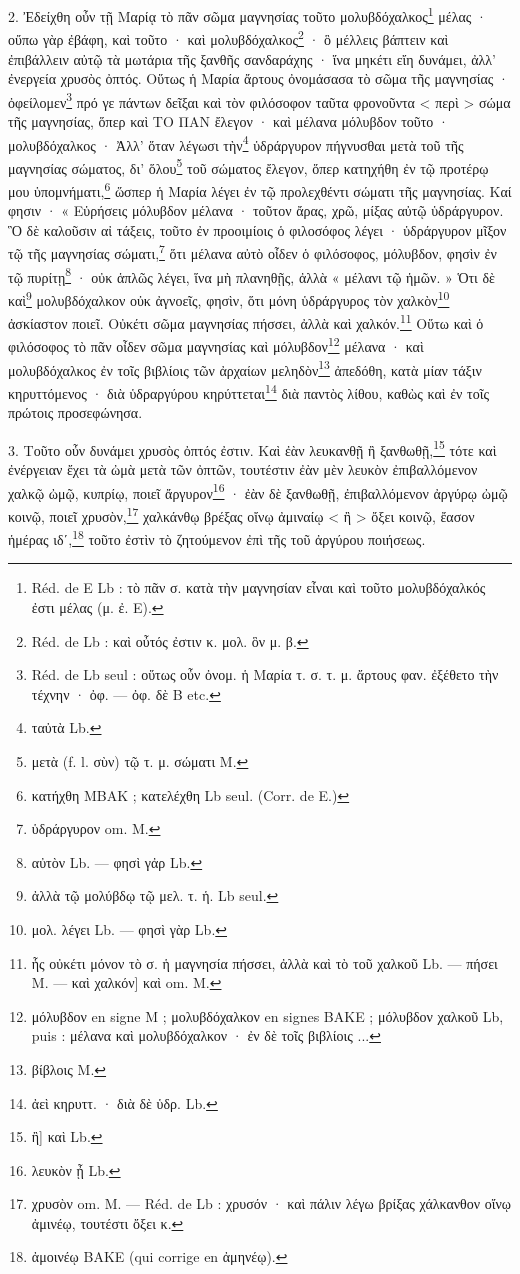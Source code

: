 \documentclass[landscape, a4paper, 11pt, oneside, polutonikogreek, french]{article}
\begin{document}
2. Ἐδείχθη οὖν τῇ Μαρίᾳ τὸ πᾶν σῶμα μαγνησίας τοῦτο μολυβδόχαλκος\footnote{Réd. de E Lb : τὸ πᾶν σ. κατὰ τὴν μαγνησίαν εἶναι καὶ τοῦτο μολυβδόχαλκός ἐστι μέλας (μ. ἐ. E).} μέλας · οὔπω γὰρ ἐβάφη, καὶ τοῦτο · καὶ μολυβδόχαλκος\footnote{Réd. de Lb : καὶ οὖτός ἐστιν κ. μολ. ὃν μ. β.} · ὃ μέλλεις βάπτειν καὶ ἐπιβάλλειν αὐτῷ τὰ μωτάρια τῆς ξανθῆς σανδαράχης · ἵνα μηκέτι εἴη δυνάμει, ἀλλ' ἐνεργεία χρυσὸς ὀπτός. Οὕτως ἡ Μαρία ἄρτους ὀνομάσασα τὸ σῶμα τῆς μαγνησίας · ὀφείλομεν\footnote{Réd. de Lb seul : οὕτως οὖν ὀνομ. ἡ Μαρία τ. σ. τ. μ. ἄρτους φαν. ἐξέθετο τὴν τέχνην · ὀφ. --- ὀφ. δὲ B etc.} πρό γε πάντων δεῖξαι καὶ τὸν φιλόσοφον ταῦτα φρονοῦντα < περὶ > σώμα τῆς μαγνησίας, ὅπερ καὶ ΤΟ ΠΑΝ ἔλεγον · καὶ μέλανα μόλυβδον τοῦτο · μολυβδόχαλκος · Ἀλλ' ὅταν λέγωσι τὴν\footnote{ταὐτὰ Lb.} ὑδράργυρον πήγνυσθαι μετὰ τοῦ τῆς μαγνησίας σώματος, δι' ὅλου\footnote{μετὰ (f. l. σὺν) τῷ τ. μ. σώματι M.} τοῦ σώματος ἔλεγον, ὅπερ κατηχήθη ἐν τῷ προτέρῳ μου ὑπομνήματι,\footnote{κατήχθη MBAK ; κατελέχθη Lb seul. (Corr. de E.)} ὥσπερ ἡ Μαρία λέγει ἐν τῷ προλεχθέντι σώματι τῆς μαγνησίας. Καί φησιν · « Εὑρήσεις μόλυβδον μέλανα · τοῦτον ἄρας, χρῶ, μίξας αὐτῷ ὑδράργυρον. Ὃ δὲ καλοῦσιν αἰ τάξεις, τοῦτο ἐν προοιμίοις ὁ φιλοσόφος λέγει · ὑδράργυρον μῖξον τῷ τῆς μαγνησίας σώματι,\footnote{ὑδράργυρον om. M.} ὅτι μέλανα αὐτὸ οἶδεν ὁ φιλόσοφος, μόλυβδον, φησὶν ἐν τῷ πυρίτῃ\footnote{αὐτὸν Lb. --- φησὶ γἀρ Lb.} · οὐκ ἁπλῶς λέγει, ἵνα μὴ πλανηθῇς, ἀλλὰ « μέλανι τῷ ἡμῶν. » Ὁτι δὲ καὶ\footnote{ἀλλὰ τῷ μολύβδῳ τῷ μελ. τ. ἡ. Lb seul.} μολυβδόχαλκον οὐκ ἀγνοεῖς, φησὶν, ὅτι μόνη ὑδράργυρος τὸν χαλκὸν\footnote{μολ. λέγει Lb. --- φησὶ γὰρ Lb.} ἀσκίαστον ποιεῖ. Οὐκέτι σῶμα μαγνησίας πήσσει, ἀλλὰ καὶ χαλκόν.\footnote{ἧς οὐκέτι μόνον τὸ σ. ἡ μαγνησία πήσσει, ἀλλὰ καὶ τὸ τοῦ χαλκοῦ Lb. --- πήσει M. --- καὶ χαλκόν] καὶ om. M.} Οὕτω καὶ ὁ φιλόσοφος τὸ πᾶν οἶδεν σῶμα μαγνησίας καὶ μόλυβδον\footnote{μόλυβδον en signe M ; μολυβδόχαλκον en signes BAKE ; μόλυβδον χαλκοῦ Lb, puis : μέλανα καὶ μολυβδόχαλκον · ἐν δὲ τοῖς βιβλίοις ...} μέλανα · καὶ μολυβδόχαλκος ἐν τοῖς βιβλίοις τῶν ἀρχαίων μεληδὸν\footnote{βίβλοις M.} ἀπεδόθη, κατὰ μίαν τάξιν κηρυττόμενος · διὰ ὑδραργύρου κηρύττεται\footnote{ἀεὶ κηρυττ. · διὰ δὲ ὑδρ. Lb.} διὰ παντὸς λίθου, καθὼς καὶ ἐν τοῖς πρώτοις προσεφώνησα.

3. Τοῦτο οὖν δυνάμει χρυσὸς ὀπτός ἐστιν. Καὶ ἐὰν λευκανθῇ ἢ ξανθωθῇ,\footnote{ἢ] καὶ Lb.} τότε καὶ ἐνέργειαν ἔχει τὰ ὠμὰ μετὰ τῶν ὀπτῶν, τουτέστιν ἐὰν μὲν λευκὸν ἐπιβαλλόμενον χαλκῷ ὠμῷ, κυπρίῳ, ποιεῖ ἄργυρον\footnote{λευκὸν ᾖ Lb.} · ἐὰν δὲ ξανθωθῇ, ἐπιβαλλόμενον ἀργύρῳ ὠμῷ κοινῷ, ποιεῖ χρυσὸν,\footnote{χρυσὸν om. M. --- Réd. de Lb : χρυσόν · καὶ πάλιν λέγω βρίξας χάλκανθον οἴνῳ ἀμινέῳ, τουτέστι ὄξει κ.} χαλκάνθῳ βρέξας οἴνῳ ἀμιναίῳ < ἢ > ὄξει κοινῷ, ἔασον ἡμέρας ιδʹ,\footnote{ἀμοινέῳ BAKE (qui corrige en ἀμηνέῳ).} τοῦτο ἐστὶν τὸ ζητούμενον ἐπὶ τῆς τοῦ ἀργύρου ποιήσεως.
\end{document}
